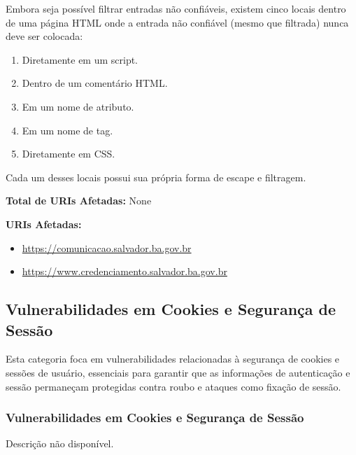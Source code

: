 \documentclass[a4paper,12pt]{article}
\begin{document}
\begin{enumerate}
Embora seja possível filtrar entradas não confiáveis, existem cinco locais dentro de uma página HTML onde a entrada não confiável (mesmo que filtrada) nunca deve ser colocada:
\begin{enumerate}
    \item Diretamente em um script.
    \item Dentro de um comentário HTML.
    \item Em um nome de atributo.
    \item Em um nome de tag.
    \item Diretamente em CSS.
\end{enumerate}
Cada um desses locais possui sua própria forma de escape e filtragem.

\textbf{Total de URIs Afetadas:} None

\textbf{URIs Afetadas:}
\begin{itemize}
    \item \url{https://comunicacao.salvador.ba.gov.br}
    \item \url{https://www.credenciamento.salvador.ba.gov.br}
\end{itemize}

\end{enumerate}
\subsection{Vulnerabilidades em Cookies e Segurança de Sessão}
Esta categoria foca em vulnerabilidades relacionadas à segurança de cookies e sessões de usuário, essenciais para garantir que as informações de autenticação e sessão permaneçam protegidas contra roubo e ataques como fixação de sessão.

\subsubsection{Vulnerabilidades em Cookies e Segurança de Sessão}
Descrição não disponível.
\end{document}
